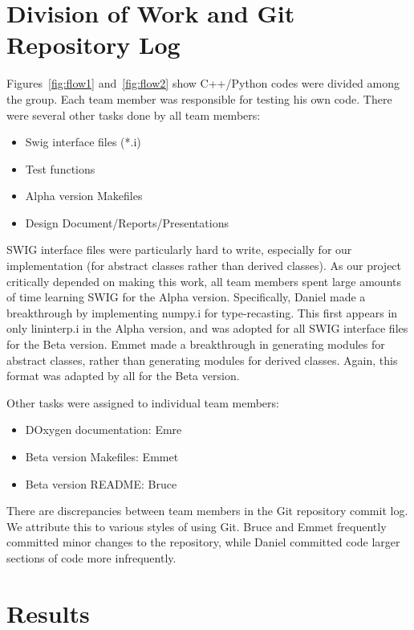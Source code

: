 \documentclass[11pt]{article}
\begin{document}

\section{Division of Work and Git Repository Log}
Figures~\ref{fig:flow1} and~\ref{fig:flow2} show C++/Python codes were
divided among the group. Each team member was responsible for testing
his own code. There were several other tasks done by all team members:
\begin{itemize}
\item Swig interface files (*.i)
\item Test functions
\item Alpha version Makefiles
\item Design Document/Reports/Presentations
\end{itemize}
SWIG interface files were particularly hard to write, especially for
our implementation (for abstract classes rather than derived
classes). As our project critically depended on making this work, all
team members spent large amounts of time learning SWIG for the Alpha
version. Specifically, Daniel made a breakthrough by implementing
numpy.i for type-recasting. This first appears in only lininterp.i in
the Alpha version, and was adopted for all SWIG interface files for
the Beta version. Emmet made a breakthrough in generating modules for
abstract classes, rather than generating modules for derived
classes. Again, this format was adapted by all for the Beta version.

Other tasks were assigned to individual team members:
\begin{itemize}
\item DOxygen documentation: Emre
\item Beta version Makefiles: Emmet
\item Beta version README: Bruce
\end{itemize}

There are discrepancies between team members in the Git repository
commit log. We attribute this to various styles of using Git. Bruce
and Emmet frequently committed minor changes to the repository, while
Daniel committed code larger sections of code more infrequently.

\section{Results}
\end{document}
